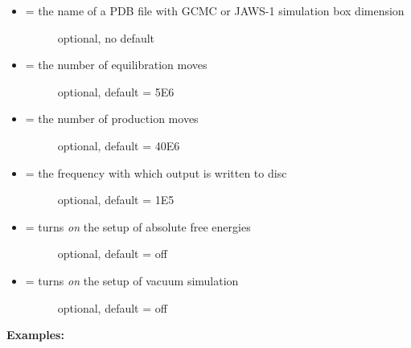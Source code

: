\documentclass[letterpaper,10pt,english]{sphinxmanual}
\begin{document}
\begin{itemize}
\item {} \begin{description}
\item[{ = the name of a PDB file with GCMC or JAWS-1 simulation box dimension}] \leavevmode
optional, no default

\end{description}

\item {} \begin{description}
\item[{ = the number of equilibration moves}] \leavevmode
optional, default = 5E6

\end{description}

\item {} \begin{description}
\item[{ = the number of production moves}] \leavevmode
optional, default = 40E6

\end{description}

\item {} \begin{description}
\item[{ = the frequency with which output is written to disc}] \leavevmode
optional, default = 1E5

\end{description}

\item {} \begin{description}
\item[{ = turns \emph{on} the setup of absolute free energies}] \leavevmode
optional, default = off

\end{description}

\item {} \begin{description}
\item[{ = turns \emph{on} the setup of vacuum simulation}] \leavevmode
optional, default = off

\end{description}

\end{itemize}

\textbf{Examples:}
\end{document}
